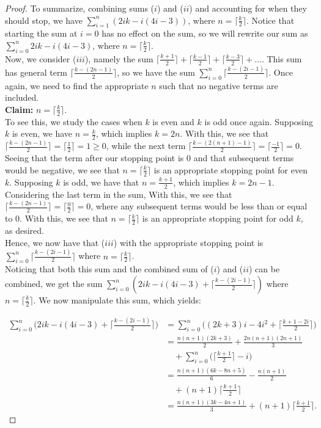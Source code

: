 \documentclass[12pt]{amsart}
\theoremstyle{plain} \numberwithin{equation}{section}
\theoremstyle{definition}
\theoremstyle{definition}
\begin{document}
\begin{proof}
    To summarize, combining sums ($i$) and ($ii$) and accounting for when they should stop, we have $\sum_{i=1}^n (2ik-i(4i-3))$, where $n = \lceil\frac{k}{2}\rceil$. Notice that starting the sum at $i=0$ has no effect on the sum, so we will rewrite our sum as $\sum_{i=0}^n 2ik-i(4i-3)$, where $n = \lceil\frac{k}{2}\rceil$. \\
    Now, we consider ($iii$), namely the sum $\lceil\frac{k+1}{2}\rceil + \lceil\frac{k-1}{2}\rceil + \lceil\frac{k-3}{2}\rceil + \dots $. This sum has general term $\lceil\frac{k-(2n-1)}{2}\rceil$, so we have the sum $\sum_{i=0}^n\lceil\frac{k-(2i-1)}{2}\rceil$. Once again, we need to find the appropriate $n$ such that no negative terms are included. \\

    \textbf{Claim:} $n = \lceil\frac{k}{2}\rceil$. \\

    To see this, we study the cases when $k$ is even and $k$ is odd once again. Supposing $k$ is even, we have $n = \frac{k}{2}$, which implies $k = 2n$. With this, we see that $\lceil\frac{k-(2n-1)}{2}\rceil = \lceil\frac{1}{2}\rceil = 1\geq 0$, while the next term $\lceil\frac{k-(2(n+1)-1)}{2}\rceil = \lceil\frac{-1}{2}\rceil = 0$. Seeing that the term after our stopping point is 0 and that subsequent terms would be negative, we see that $n = \lceil\frac{k}{2}\rceil$ is an appropriate stopping point for even $k$. Supposing $k$ is odd, we have that $n = \frac{k+1}{2}$, which implies $k = 2n-1$. Considering the last term in the sum, With this, we see that $\lceil\frac{k-(2n-1)}{2}\rceil = \lceil\frac{0}{2}\rceil = 0$, where any subsequent terms would be less than or equal to 0. With this, we see that $n = \lceil\frac{k}{2}\rceil$ is an appropriate stopping point for odd $k$, as desired. \\

    Hence, we now have that ($iii$) with the appropriate stopping point is $\sum_{i=0}^n\lceil\frac{k-(2i-1)}{2}\rceil$ where $n = \lceil\frac{k}{2}\rceil$. \\
    Noticing that both this sum and the combined sum of ($i$) and ($ii$) can be combined, we get the sum $\sum_{i=0}^n (2ik - i(4i-3) + \lceil\frac{k-(2i-1)}{2}\rceil)$ where $n = \lceil\frac{k}{2}\rceil$. We now manipulate this sum, which yields:

    \begin{align*}
        \sum_{i=0}^n \bigg(2ik - i(4i-3) + \bigg\lceil\frac{k-(2i-1)}{2}\bigg\rceil\bigg) &= \sum_{i=0}^n \bigg((2k+3)i - 4i^2 + \bigg\lceil\frac{k+1-2i}{2}\bigg\rceil\bigg)\\
        &= \frac{n(n+1)(2k+3)}{2} + \frac{2n(n+1)(2n+1)}{3}\\
        &\quad + \sum_{i=0}^n\bigg(\bigg\lceil\frac{k+1}{2}\bigg\rceil - i\bigg)\\
        &= \frac{n(n+1)(6k-8n+5)}{6} - \frac{n(n+1)}{2}\\
        &\quad + (n+1)\bigg\lceil\frac{k+1}{2}\bigg\rceil\\
        &= \frac{n(n+1)(3k-4n+1)}{3}+(n+1)\bigg\lceil\frac{k+1}{2}\bigg\rceil.
    \end{align*} 
\end{proof}
\end{document}
